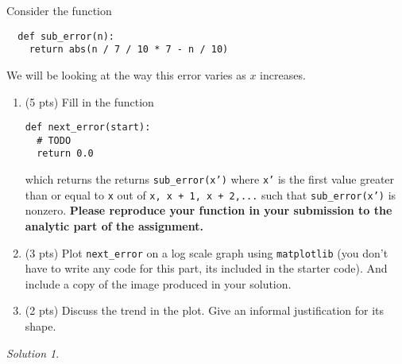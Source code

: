 \documentclass{article}
\theoremstyle{remark}
\newtheorem*{solution}{Solution}
\begin{document}
Consider the function
\begin{lstlisting}
  def sub_error(n):
    return abs(n / 7 / 10 * 7 - n / 10)
\end{lstlisting}
We will be looking at the way this error varies as $x$ increases.
\begin{enumerate}
\item (5 pts) Fill in the function
\begin{lstlisting}
def next_error(start):
  # TODO
  return 0.0
\end{lstlisting}
which returns the returns \texttt{sub\_error(x')} where \texttt{x'} is the first value greater than or equal to \texttt{x} out of \texttt{x, x + 1, x + 2,...} such that \texttt{sub\_error(x')} is nonzero.
\textbf{Please reproduce your function in your submission to the analytic part of the assignment.}

\item (3 pts) Plot \texttt{next\_error} on a log scale graph using \texttt{matplotlib} (you don't have to write any code for this part, its included in the starter code). And include a copy of the image produced in your solution.

\item (2 pts) Discuss the trend in the plot. Give an informal justification for its shape.
\end{enumerate}

\begin{solution}
\end{solution}
\end{document}
